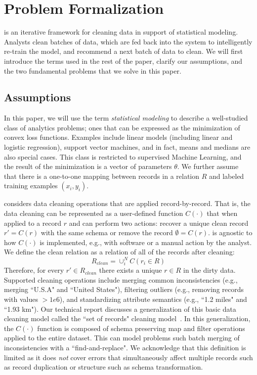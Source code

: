 \section{Problem Formalization}\label{statements}
\sys is an iterative framework for cleaning data in support of statistical modeling.
Analysts clean batches of data, which are fed back into the system to intelligently re-train the model, and recommend a next batch of data to clean.
We will first introduce the terms used in the rest of the paper, clarify our assumptions, and the two fundamental problems that we solve in this paper.

\subsection{Assumptions}\label{dmodel}
In this paper, we will use the term \emph{statistical modeling} to describe a well-studied class of analytics problems; ones that can be expressed as the minimization of convex loss functions.
Examples include linear models (including linear and logistic regression), support vector machines, and in fact, means and medians are also special cases. 
This class is restricted to supervised Machine Learning, and the result of the minimization is a vector of parameters $\theta$.
We further assume that there is a one-to-one mapping between records in a relation $R$ and labeled training examples $(x_{i},y_{i})$.

\sys considers data cleaning operations that are applied record-by-record.
That is, the data cleaning can be represented as a user-defined function $C(\cdot)$ that when applied to a record $r$ and can perform two actions: recover a unique clean record $r' = C(r)$ with the same schema or remove the record $\emptyset = C(r)$.
\sys is agnostic to how $C(\cdot)$ is implemented, e.g., with software or a manual action by the analyst.
We define the clean relation as a relation of all of the records after cleaning:
\[R_{clean} = \cup_i^N C(r_i \in R)\]
Therefore, for every $r' \in R_{clean}$ there exists a unique $r \in R$ in the dirty data.
Supported cleaning operations include merging common inconsistencies (e.g., merging ``U.S.A" and ``United States"), filtering outliers (e.g., removing records with values $>1e6$), and standardizing attribute semantics (e.g., ``1.2 miles" and ``1.93 km").
Our technical report discusses a generalization of this basic data cleaning model called the ``set of records" cleaning model~\cite{activecleanarxiv}.
In this generalization, the $C(\cdot)$ function is composed of schema preserving \textsf{map} and \textsf{filter} operations applied to the entire dataset.
This can model problems such batch merging of inconsistencies with a ``find-and-replace".
We acknowledge that this definition is limited as it does \emph{not} cover errors that simultaneously affect multiple records such as record duplication or structure such as schema transformation.

